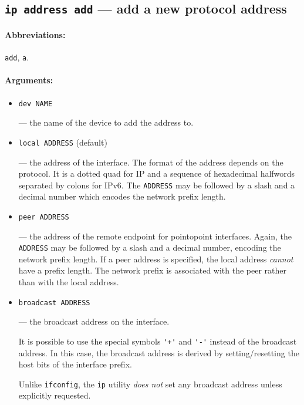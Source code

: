 \subsection{{\tt ip address add} --- add a new protocol address}
\label{IP-ADDR-ADD}

\paragraph{Abbreviations:} \verb|add|, \verb|a|.

\paragraph{Arguments:}

\begin{itemize}
\item \verb|dev NAME|

\noindent--- the name of the device to add the address to.

\item \verb|local ADDRESS| (default)

--- the address of the interface. The format of the address depends
on the protocol. It is a dotted quad for IP and a sequence of hexadecimal halfwords
separated by colons for IPv6. The \verb|ADDRESS| may be followed by
a slash and a decimal number which encodes the network prefix length.


\item \verb|peer ADDRESS|

--- the address of the remote endpoint for pointopoint interfaces.
Again, the \verb|ADDRESS| may be followed by a slash and a decimal number,
encoding the network prefix length. If a peer address is specified,
the local address {\em cannot\/} have a prefix length. The network prefix is associated
with the peer rather than with the local address.


\item \verb|broadcast ADDRESS|

--- the broadcast address on the interface.

It is possible to use the special symbols \verb|'+'| and \verb|'-'|
instead of the broadcast address. In this case, the broadcast address
is derived by setting/resetting the host bits of the interface prefix.

\vskip 1mm
\begin{NB}
Unlike \verb|ifconfig|, the \verb|ip| utility {\em does not\/} set any broadcast
address unless explicitly requested.
\end{NB}



\end{itemize}
